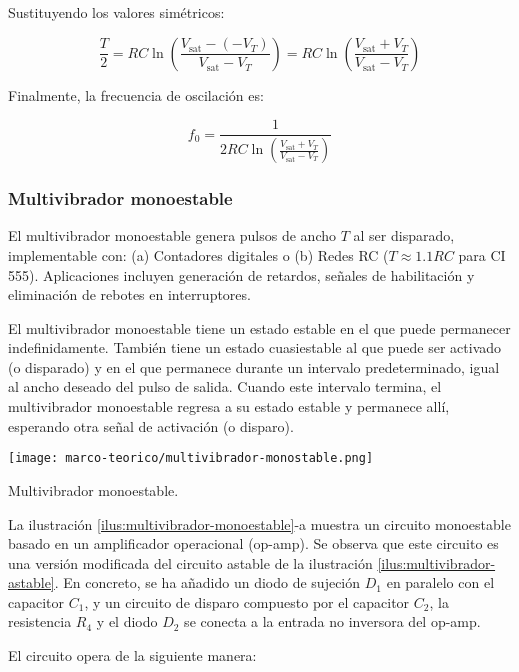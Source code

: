 Sustituyendo los valores simétricos:

\[
\frac{T}{2} = RC \ln \left( \frac{V_{\text{sat}} - (-V_T)}{V_{\text{sat}} - V_T} \right) = RC \ln \left( \frac{V_{\text{sat}} + V_T}{V_{\text{sat}} - V_T} \right)
\]

Finalmente, la frecuencia de oscilación es:

\[
f_0 = \frac{1}{2RC \ln \left( \frac{V_{\text{sat}} + V_T}{V_{\text{sat}} - V_T} \right)}
\]


\subsubsection{Multivibrador monoestable}

El multivibrador monoestable genera pulsos de ancho $T$ al ser disparado, implementable con: (a) Contadores digitales o (b) Redes RC ($T \approx 1.1RC$ para CI 555). Aplicaciones incluyen generación de retardos, señales de habilitación y eliminación de rebotes en interruptores. \cite[pag. 498]{sergio-franco}

El multivibrador monoestable tiene un estado estable en el que puede permanecer indefinidamente. También tiene un estado cuasiestable al que puede ser activado (o disparado) y en el que permanece durante un intervalo predeterminado, igual al ancho deseado del pulso de salida. Cuando este intervalo termina, el multivibrador monoestable regresa a su estado estable y permanece allí, esperando otra señal de activación (o disparo). \cite[pag. 1368]{sedra-smith}

\begin{ilustracion}[ht]
  \centering
  \texttt{[image: marco-teorico/multivibrador-monostable.png]}
  \caption
  {Multivibrador monoestable.}
  \label{ilus:multivibrador-monoestable}
\end{ilustracion}

La ilustración \ref{ilus:multivibrador-monoestable}-a muestra un circuito monoestable basado en un amplificador operacional (op-amp). Se observa que este circuito es una versión modificada del circuito astable de la ilustración \ref{ilus:multivibrador-astable}. En concreto, se ha añadido un diodo de sujeción \( D_1 \) en paralelo con el capacitor \( C_1 \), y un circuito de disparo compuesto por el capacitor \( C_2 \), la resistencia \( R_4 \) y el diodo \( D_2 \) se conecta a la entrada no inversora del op-amp. \cite[pag. 1368]{sedra-smith}

El circuito opera de la siguiente manera:

